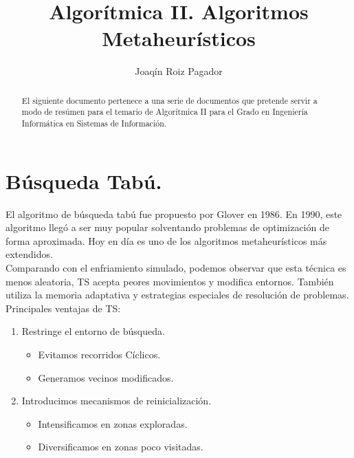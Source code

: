 \documentclass{llncs}
\begin{document}
\title{Algor\'{i}tmica II. Algoritmos Metaheur\'{i}sticos}
%
%
\author{Joaq\'{i}n Roiz Pagador}
%
%
%

\maketitle              %

\begin{abstract}
El siguiente documento pertenece a una serie de documentos que pretende servir a modo de res\'{u}men para el temario de Algor\'{i}tmica II para el Grado en Ingenier\'{i}a Inform\'{a}tica en Sistemas de Informaci\'{o}n.\\
\end{abstract}
%
\section*{B\'{u}squeda Tab\'{u}.}
%
El algoritmo de b\'{u}squeda tab\'{u} fue propuesto por Glover en 1986. En 1990, este algoritmo lleg\'{o} a ser muy popular solventando problemas de optimizaci\'{o}n de forma aproximada. Hoy en d\'{i}a es uno de los algoritmos metaheur\'{i}sticos m\'{a}s extendidos.\\

Comparando con el enfriamiento simulado,  podemos observar que esta t\'{e}cnica es menos aleatoria, TS acepta peores movimientos y modifica entornos. Tambi\'{e}n utiliza la memoria adaptativa y estrategias especiales de resoluci\'{o}n de problemas.\\

Principales ventajas de TS:\\
\begin{enumerate}
\item Restringe el entorno de b\'{u}squeda.
\begin{itemize}
\item Evitamos recorridos C\'{i}clicos.
\item Generamos vecinos modificados.
\end{itemize}
\item Introducimos mecanismos de reinicializaci\'{o}n.
\begin{itemize}
\item Intensificamos en zonas exploradas.
\item Diversificamos en zonas poco visitadas.
\end{itemize}
\end{enumerate}
\end{document}
